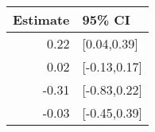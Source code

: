 \begin{tabular}{rl}
  \hline
Estimate & 95\% CI \\ 
  \hline
0.22 & [0.04,0.39] \\ 
  0.02 & [-0.13,0.17] \\ 
  -0.31 & [-0.83,0.22] \\ 
  -0.03 & [-0.45,0.39] \\ 
   \hline
\end{tabular}

